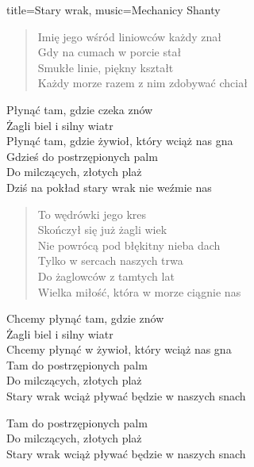 \begin{song}{title={Stary wrak}, music={Mechanicy Shanty}}
\begin{multicols}{2}
\begin{verse}
        Imię jego wśród liniowców każdy znał \\
        Gdy na cumach w porcie stał \\
        Smukłe linie, piękny kształt \\
        Każdy morze razem z nim zdobywać chciał
    \end{verse}
    \begin{chorus*}
        Płynąć tam, gdzie czeka znów \\
        Żagli biel i silny wiatr \\
        Płynąć tam, gdzie żywioł, który wciąż nas gna \\
        Gdzieś do postrzępionych palm \\
        Do milczących, złotych plaż \\
        Dziś na pokład stary wrak nie weźmie nas
    \end{chorus*}
    \begin{verse}
        To wędrówki jego kres \\
        Skończył się już żagli wiek \\
        Nie powrócą pod błękitny nieba dach \\
        Tylko w sercach naszych trwa \\
        Do żaglowców z tamtych lat \\
        Wielka miłość, która w morze ciągnie nas
    \end{verse}
    \begin{chorus*}
        Chcemy płynąć tam, gdzie znów \\
        Żagli biel i silny wiatr \\
        Chcemy płynąć w żywioł, który wciąż nas gna \\
        Tam do postrzępionych palm \\
        Do milczących, złotych plaż \\
        Stary wrak wciąż pływać będzie w naszych snach
    \end{chorus*}
    \begin{interlude}
        Tam do postrzępionych palm \\
        Do milczących, złotych plaż \\
        Stary wrak wciąż pływać będzie w naszych snach
    \end{interlude}
    \end{multicols}
\end{song}

